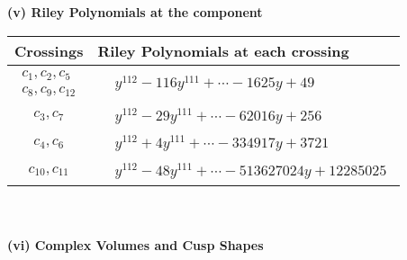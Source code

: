 \documentclass[1p]{elsarticle_modified}
\theoremstyle{definition}
\begin{document}
\newpage\renewcommand{\arraystretch}{1}
\flushleft \textbf{(v) Riley Polynomials at the component}\newline \\
\begin{tabular}{m{50pt}|m{274pt}}
Crossings & \hspace{64pt}Riley Polynomials at each crossing \\
\hline $$\begin{aligned}c_{1},c_{2},c_{5}\\c_{8},c_{9},c_{12}\end{aligned}$$&$\begin{aligned}
&y^{112}-116 y^{111}+\cdots-1625 y+49
\end{aligned}$\\
\hline $$\begin{aligned}c_{3},c_{7}\end{aligned}$$&$\begin{aligned}
&y^{112}-29 y^{111}+\cdots-62016 y+256
\end{aligned}$\\
\hline $$\begin{aligned}c_{4},c_{6}\end{aligned}$$&$\begin{aligned}
&y^{112}+4 y^{111}+\cdots-334917 y+3721
\end{aligned}$\\
\hline $$\begin{aligned}c_{10},c_{11}\end{aligned}$$&$\begin{aligned}
&y^{112}-48 y^{111}+\cdots-513627024 y+12285025
\end{aligned}$\\
\hline
\end{tabular}\\~\\
\newpage\flushleft \textbf{(vi) Complex Volumes and Cusp Shapes}
\end{document}
